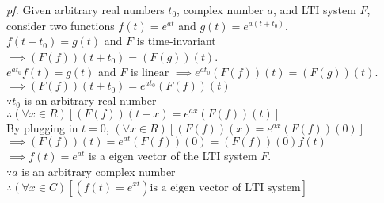 \documentclass{article}
\newcommand{\sd}[1]{{\left(#1\right)}}
\newcommand{\pf}[1]{\emph{pf.} #1}
\newcommand{\md}[1]{{\left[#1\right]}}
\begin{document}
\pf{Given arbitrary real numbers $t_0$, complex number $a$, and LTI system $F$, consider two functions $f\sd{t} = e^{at}$ and $g\sd{t} = e^{a\sd{t+t_0}}$.\\
$f\sd{t+t_0} = g\sd{t}$ and $F$ is time-invariant $\implies\sd{F\sd{f}}\sd{t+t_0} = \sd{F\sd{g}}\sd{t}$.\\
$e^{at_0}f\sd{t} = g\sd{t}$ and $F$ is linear $\implies e^{at_0}\sd{F\sd{f}}\sd{t} = \sd{F\sd{g}}\sd{t}$.\\
$\implies \sd{F\sd{f}}\sd{t+t_0} = e^{at_0}\sd{F\sd{f}}\sd{t}$\\
$\because t_0$ is an arbitrary real number $\therefore \sd{\forall x \in R}\md{\sd{F\sd{f}}\sd{t+x} = e^{ax}\sd{F\sd{f}}\sd{t}}$\\
By plugging in $t = 0$, $\sd{\forall x \in R}\md{\sd{F\sd{f}}\sd{x} = e^{ax}\sd{F\sd{f}}\sd{0}}$\\
$\implies \sd{F\sd{f}}\sd{t} = e^{at}\sd{F\sd{f}}\sd{0} = \sd{F\sd{f}}\sd{0}f\sd{t}$\\
$\implies f\sd{t} = e^{at}$ is a eigen vector of the LTI system $F$.\\
$\because a$ is an arbitrary complex number $\therefore \sd{\forall x \in C}\md{\sd{f\sd{t} = e^{xt}}\text{is a eigen vector of LTI system}}$
}\\
\end{document}
